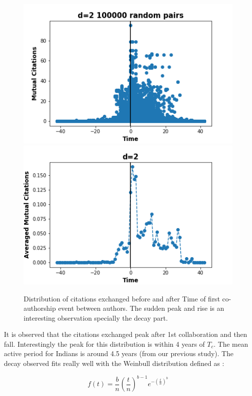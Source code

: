 \documentclass[aps, pre, twocolumn, nofootinbib]{revtex4-1}
\begin{document}
\begin{figure}[htbp]  
	\centering
	
	\includegraphics[scale = 0.49]{plots/d2}
	\includegraphics[scale = 0.49]{plots/d2_avg}
	
	\captionsetup{singlelinecheck=false, justification=raggedright,  labelsep=space}
	\caption{Distribution of citations exchanged before and after Time of first co-authorship event between authors. The sudden peak and rise is an interesting observation specially the decay part.}
	\label{f5}
\end{figure}

It is observed that the citations exchanged peak after 1st collaboration and then fall. Interestingly the peak for this distribution is within 4 years of $T_c$. The mean active period for Indians is around 4.5 years (from our previous study). The decay observed fits really well with the Weinbull distribution defined as :

\begin{equation}
 f(t) = \frac{b}{n}(\frac{t}{n})^{b-1} e^{-(\frac{t}{n})^b}
\end{equation}
\end{document}
